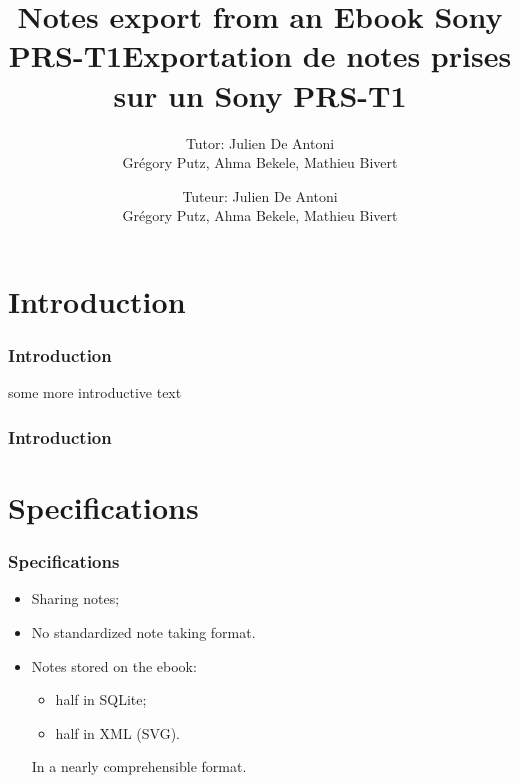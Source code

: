\documentclass[t,12pt]{beamer}
\title{Notes export from an Ebook Sony PRS-T1}
\author{Tutor: Julien De Antoni\\Grégory Putz, Ahma Bekele, Mathieu Bivert}
\date{\oldstylenums{June 2012}}
\title{Exportation de notes prises sur un Sony PRS-T1}
\author{Tuteur: Julien De Antoni\\Grégory Putz, Ahma Bekele, Mathieu Bivert}
\date{\oldstylenums{Juin 2012}}
\begin{document}
\frame{\titlepage}

\section{Introduction}

\begin{frame}
  \frametitle{Introduction}
  some more introductive text
\end{frame}

\begin{frame}
  \frametitle{Introduction}
  \centering
  \tableofcontents
\end{frame}



\section{Specifications}
\begin{frame}
  \frametitle{Specifications}
  \begin{itemize}
  \pause \item Sharing notes;
  \pause \item No standardized note taking format.
  \pause \item Notes stored on the ebook:
    \begin{itemize}
      \item half in SQLite;
      \item half in XML (SVG).
    \end{itemize}
  \pause In a nearly comprehensible format.
  \end{itemize}
\end{frame}
\end{document}
